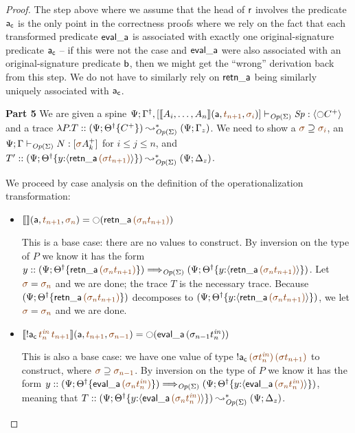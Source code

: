 \begin{proof}
The step above where we assume that the head of ${\sf r}$ involves the
predicate ${\sf a_c}$ is the only point in the correctness proofs where
we rely on the fact that each transformed predicate ${\sf eval\_a}$ is
associated with exactly one original-signature predicate ${\sf a_c}$ --
if this were not the case and ${\sf eval\_a}$ were also associated
with an original-signature predicate ${\sf b}$, then we might get the
``wrong'' derivation back from this step. We do not have to similarly
rely on ${\sf retn\_a}$ being similarly uniquely associated with ${\sf
  a_c}$.


\bigskip\noindent
{\bf Part 5}
We are given a spine
$\slst{\transop{\Sigma}}{\Psi}
  {\opsubst{\Gamma},[\opbasic{A_i,\ldots,A_n}{t_{n+1}}{\sigma_i}]}
  {\Sp}{\susp{{\ocircle}C^+}}$ and a trace
$\lambda P.T :: (\Psi; {{{\Theta}^\dag}}\{{C^+}\})
         \leadsto^*_{{\it Op}({\Sigma})}
       (\Psi; \Gamma_z)$. 
We need to show a $\lf{\sigma} \supseteq \lf{\sigma_i}$, an
$\slst{\transop{\Sigma}}{\Psi}{\Gamma}{N}{[\lf\sigma A^+_k]}$
for $i \leq j \leq n$, and 
$T' :: (\Psi; \tackon{\opsubst{\Theta}}{y{:}\susp{{\sf retn\_a}\,\lf{(\lf{\sigma t_{n+1}})}}})
  \leadsto^*_{\transop{\Sigma}}
 (\Psi; \Delta_z)$.

We proceed by case analysis on the definition of
the operationalization transformation:
\smallskip
\begin{itemize}
\item $\opbasic{}{t_{n+1}}{\sigma_n} = {\ocircle}({\sf retn\_a}\,\lf{(\sigma_{n}{t_{n+1}})})$

  \bigskip
  This is a base case: there are no values to construct. By inversion on the
  type of $P$ we know it has the form
  $y :: (\Psi; \tackon{\opsubst{\Theta}}{{\sf retn\_a}\,\lf{(\sigma_{n}{t_{n+1}})}}) \Longrightarrow_{\transop{\Sigma}} (\Psi; \tackon{\opsubst{\Theta}}{y{:}\susp{{\sf retn\_a}\,\lf{(\sigma_{n}{t_{n+1}})}}})$. 
  Let $\lf{\sigma} = \lf{\sigma_n}$
  and we are done; the trace $T$ is the necessary trace. 
  Because
  $(\Psi; \tackon{\opsubst{\Theta}}{{\sf retn\_a}\,\lf{(\sigma_{n}{t_{n+1}})}})$
  decomposes to 
  $(\Psi; \tackon{\opsubst{\Theta}}{y{:}\susp{{\sf retn\_a}\,\lf{(\sigma_{n}{t_{n+1}})}}})$, we let $\lf{\sigma} = \lf{\sigma_n}$ and we are done.
  \bigskip

\item $\opbasic{{!}{\sf a_c}\,\lf{t^{\it in}_n}\,\lf{t_{n+1}}}{t_{n+1}}{\sigma_{n-1}} 
  = {\ocircle}({\sf eval\_a}\,(\sigma_{n-1}{t^{\it in}_n}))$

  \bigskip
  This is also a base case: we have one value of type 
  ${!}{\sf a_c}\,\lf{({\sigma}t^{\it in}_n)}\,\lf{({\sigma}t_{n+1})}$ to construct, where
  $\lf{\sigma} \supseteq \lf{\sigma_{n-1}}$. By inversion on the type of
  $P$ we know it has the form 
  $y :: (\Psi; \tackon{\opsubst{\Theta}}{{\sf eval\_a}\,\lf{(\sigma_{n}{t^{\it in}_{n}})}}) \Longrightarrow_{\transop{\Sigma}}
     (\Psi; \tackon{\opsubst{\Theta}}
            {y{:}\susp{{\sf eval\_a}\,\lf{(\sigma_{n}{t^{\it in}_{n}})}}})$, 
  meaning that $T :: (\Psi; \tackon{\opsubst{\Theta}}
            {y{:}\susp{{\sf eval\_a}\,\lf{(\sigma_{n}{t^{\it in}_{n}})}}})
    \leadsto^*_{\transop{\Sigma}}
 (\Psi; \Delta_z)$.


\end{itemize}
\end{proof}
